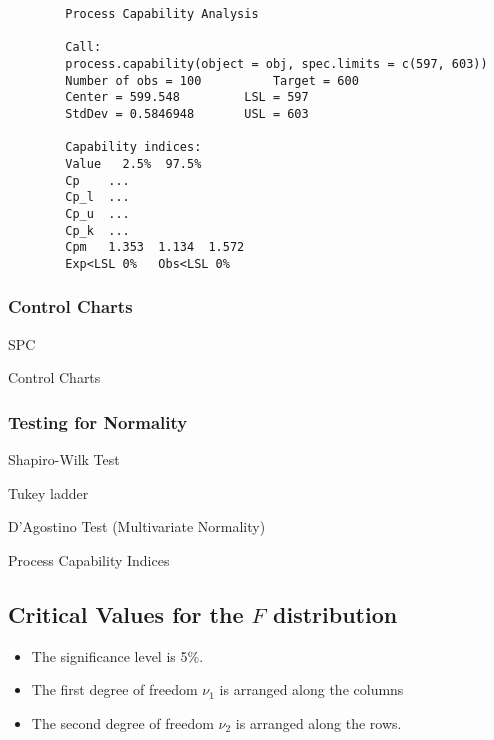 \documentclass[a4paper,12pt]{article}
\begin{document}
\begin{itemize}
	
	\newpage
	\begin{framed}
		\begin{verbatim}
		Process Capability Analysis
		
		Call:
		process.capability(object = obj, spec.limits = c(597, 603))
		Number of obs = 100          Target = 600
		Center = 599.548         LSL = 597
		StdDev = 0.5846948       USL = 603
		
		Capability indices:
		Value   2.5%  97.5%
		Cp    ...
		Cp_l  ...
		Cp_u  ...
		Cp_k  ...
		Cpm   1.353  1.134  1.572
		Exp<LSL 0%   Obs<LSL 0%
		\end{verbatim}
	\end{framed}
	
	
	

	\newpage
\end{itemize}

\newpage
\subsubsection*{Control Charts}
SPC

Control Charts
\subsubsection*{Testing for Normality}
Shapiro-Wilk Test

Tukey ladder

D'Agostino Test (Multivariate Normality)



Process Capability Indices

	\newpage
\subsection*{Critical Values for the $F$ distribution}
\begin{itemize}
	\item 
	The significance level is 5\%.
	\item 
	The first degree of freedom $\nu_1$ is arranged along the columns
	\item 
	The second degree of freedom $\nu_2$ is arranged along the rows.
\end{itemize}
\end{document}

